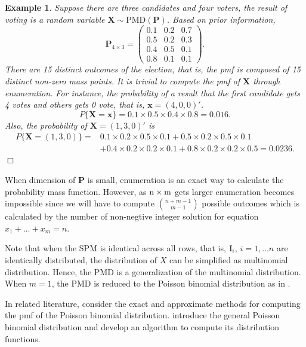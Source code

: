 \documentclass[12pt]{article}
\newcommand{\Xmat}{\mathbf{X}}
\newcommand{\Pmat}{\mathbf{P}}
\newcommand{\PMD}{\textrm{PMD}}
\newcommand{\xvec}{\boldsymbol{x}}
\newcommand{\qedw}{\hfill \ensuremath{\Box}}
\newtheorem{example}{Example}
\begin{document}
\begin{example}\normalfont
Suppose there are three candidates and four voters, the result of voting is a random variable $\Xmat \sim \PMD(\Pmat)$. Based on prior information,
\begin{equation*}
\Pmat_{4 \times 3} = \begin{pmatrix}
0.1 &  0.2 & 0.7\\
0.5 & 0.2 & 0.3\\
0.4 &  0.5 & 0.1\\
0.8 & 0.1 & 0.1
\end{pmatrix}.
\end{equation*}
There are 15 distinct outcomes of the election, that is, the pmf is composed of 15 distinct non-zero mass points. It is trivial to compute the pmf of $\Xmat$ through enumeration. For instance, the probability of a result that the first candidate gets 4 votes and others gets 0 vote, that is, $\xvec =  (4,0,0)'$.
\begin{equation*}
P\{\Xmat = \xvec \} = 0.1\times 0.5 \times 0.4 \times 0.8 = 0.016.
\end{equation*}
Also, the probability of $\Xmat=(1,3,0)'$ is
\begin{align*}
P\{\Xmat = (1,3,0)\}  =  & 0.1\times 0.2 \times 0.5 \times 0.1 +
 0.5\times0.2\times0.5 \times 0.1 \\
 & + 0.4\times0.2\times0.2\times0.1 + 0.8\times0.2\times0.2\times0.5 = 0.0236.
\end{align*}
\qedw
\end{example}

When dimension of $\Pmat$ is small, enumeration is an exact way to calculate the probability mass function. However, as $\rm n \times m$ gets larger enumeration becomes impossible since we will have to compute $\binom{n+m-1}{m-1}$ possible outcomes which is calculated by the number of non-negtive integer solution for equation $x_1 + \dots + x_m = n$.


Note that when the SPM is identical across all rows, that is, $\rm I_{i}$, $i = 1, \dots n$ are identically distributed, the distribution of $X$ can be simplified as multinomial distribution. Hence, the $\PMD$ is a generalization of the multinomial distribution. When $m=1$, the $\PMD$ is reduced to the Poisson binomial distribution as in .

In related literature,  consider the exact and approximate methods for computing the pmf of the Poisson binomial distribution.  introduce the general Poisson binomial distribution and develop an algorithm to compute its distribution functions.
\end{document}
